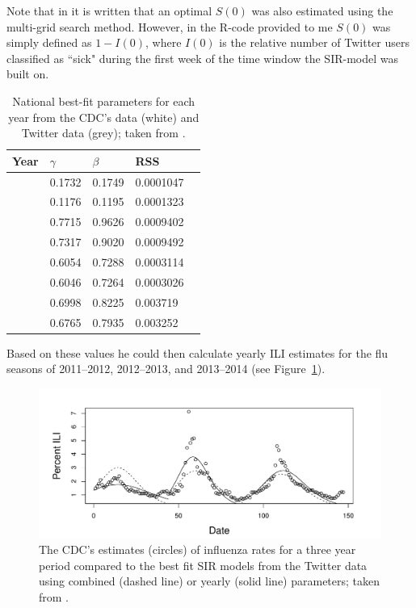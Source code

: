 \documentclass[11pt, a4paper,twoside]{report}\usepackage[]{graphicx}\usepackage[]{color}
\begin{document}
Note that in \cite{bodnar_data_2015} it is written that an optimal $S(0)$ was also estimated using the multi-grid search method. However, in the R-code provided to me $S(0)$ was simply defined as $1-I(0)$, where $I(0)$ is the relative number of Twitter users classified as ``sick" during the first week of the time window the SIR-model was built on.

\begin{table}[H]
\centering
\caption{National best-fit parameters for each year from the CDC's data (white) and Twitter data (grey); taken from \cite{bodnar_data_2015}.}
\begin{tabular}{l l l l l}

 Year & \(\gamma\) & \(\beta\) & RSS\\ \hline
& 0.1732 & 0.1749  & 0.0001047   \\ 
 {\multirow{-2}{*}{ 2011-2012 }}  & \cellcolor{grey}0.1176  & \cellcolor{grey}0.1195  & \cellcolor{grey}0.0001323  \\ \cline{2-4}
  {\multirow{2}{*}{ 2012-2013 }}& 0.7715 & 0.9626 & 0.0009402   \\ 
   & \cellcolor{grey}0.7317  & \cellcolor{grey}0.9020 & \cellcolor{grey}0.0009492   \\ \cline{2-4}
  {\multirow{2}{*}{ 2013-2014 }}& 0.6054 & 0.7288   & 0.0003114   \\ 
   & \cellcolor{grey}0.6046 & \cellcolor{grey}0.7264 & \cellcolor{grey}0.0003026  \\ \cline{2-4}
  {\multirow{2}{*}{ Combined }}& 0.6998 & 0.8225  & 0.003719   \\ 
   & \cellcolor{grey}0.6765  & \cellcolor{grey}0.7935  & \cellcolor{grey}0.003252   \\ 
\end{tabular}
\label{tab:nationalparams}
\end{table}

Based on these values he could then calculate yearly ILI estimates for the flu seasons of 2011--2012, 2012--2013, and 2013--2014 (see Figure~\ref{fig:cdc_fit_bodnar_thesis_SIR}).

\begin{figure}[H]
  \centering
    \includegraphics[width=1\textwidth]{todd_bodnar_SIR.png}
  \caption{The CDC's estimates (circles) of influenza rates for a three year period compared to the best fit SIR models from the Twitter data using combined (dashed line) or yearly (solid line) parameters; taken from \cite{bodnar_data_2015}.}
  \label{fig:cdc_fit_bodnar_thesis_SIR}
  \end{figure}
\end{document}

